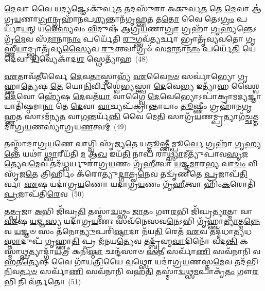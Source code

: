 \-\ul{𑌦𑍇}\-𑌵𑌾 𑌵𑍈 𑌯\-\ul{𑌦𑍍𑌯}\-𑌜𑍍𑌞𑍇\-𑌽𑌕𑍁᳴𑌰𑍍𑌵\-\ul{𑌤} 𑌤𑌦𑌸𑍁᳴𑌰𑌾 𑌅𑌕𑍁𑌰𑍍𑌵\-\ul{𑌤} 𑌤𑍇 \ul{𑌦𑍇}\-𑌵𑌾 𑌆॑𑌗𑍍𑌰\-\ul{𑌯}\-𑌣𑌾\-\ul{𑌗𑍍𑌰𑌾}\-𑌨𑍍𑌗𑍍𑌰𑌹𑌾᳴𑌨𑌪\-\ul{𑌶𑍍𑌯}\-𑌨𑍍𑌤𑌾𑌨᳴𑌗𑍃𑌹𑍍𑌣\-\ul{𑌤} 𑌤\-\ul{𑌤𑍋} 𑌵𑍈 𑌤𑍇\-𑌽\-\ul{𑌗𑍍𑌰𑌂} 𑌪𑌰𑍍𑌯𑌾᳴\-\ul{𑌯}\-\-\ul{𑌨𑍍} 𑌯\-\ul{𑌸𑍍𑌯𑍈}\-𑌵𑌂 \ul{𑌵𑌿}\-𑌦𑍁𑌷᳴ 𑌆𑌗𑍍𑌰\-\ul{𑌯}\-𑌣𑌾\-\ul{𑌗𑍍𑌰𑌾} 𑌗𑍍𑌰𑌹𑌾᳴ \ul{𑌗𑍃}\-𑌹𑍍𑌯𑌨𑍍𑌤𑍇\-𑌽𑌗𑍍𑌰᳴\-\ul{𑌮𑍇}\-𑌵 𑌸᳴\-\ul{𑌮𑌾}\-𑌨𑌾\-\ul{𑌨𑌾𑌂} 𑌪𑌰𑍍𑌯𑍇᳴𑌤𑌿 \ul{𑌰𑍁}\-𑌗𑍍𑌣𑌵᳴\-\ul{𑌤𑍍𑌯}\-𑌰𑍍𑌚𑌾 𑌭𑍍𑌰𑌾𑌤𑍃᳴𑌵𑍍𑌯𑌵𑌤𑍋 𑌗𑍃𑌹𑍍𑌣𑍀\-\ul{𑌯𑌾}\-𑌦𑍍𑌭𑍍𑌰𑌾𑌤𑍃᳴𑌵𑍍𑌯\-\ul{𑌸𑍍𑌯𑍈}\-𑌵 \ul{𑌰𑍁}\-𑌕𑍍𑌤𑍍𑌵𑌾𑌗𑍍𑌰𑍞᳴ 𑌸\-\ul{𑌮𑌾}\-𑌨𑌾\-\ul{𑌨𑌾𑌂} 𑌪𑌰𑍍𑌯𑍇᳴\-\ul{𑌤𑌿} 𑌯𑍇 𑌦𑍇᳴𑌵𑌾 \ul{𑌦𑌿}\-𑌵𑍍𑌯𑍇𑌕𑌾᳴\-𑌦\-\ul{𑌶} 𑌸𑍍𑌥𑍇𑌤𑍍𑌯𑌾᳴𑌹~(48)

\-\ul{𑌏}\-𑌤𑌾𑌵᳴\-\ul{𑌤𑍀}\-𑌰𑍍𑌵𑍈 \ul{𑌦𑍇}\-𑌵\-\ul{𑌤𑌾}\-𑌸𑍍𑌤𑌾𑌭𑍍𑌯᳴ \ul{𑌏}\-𑌵𑍈\-\ul{𑌨}\-\-\ul{𑍞} 𑌸𑌰𑍍𑌵𑌾॑𑌭𑍍𑌯𑍋 𑌗𑍃𑌹𑍍𑌣𑌾\-\ul{𑌤𑍍𑌯𑍇}\-𑌷 \ul{𑌤𑍇} 𑌯𑍋\-\ul{𑌨𑌿}\-𑌰𑍍𑌵𑌿𑌶𑍍𑌵𑍇॑𑌭𑍍𑌯𑌸𑍍𑌤𑍍𑌵𑌾 \ul{𑌦𑍇}\-𑌵𑍇\-\ul{𑌭𑍍𑌯} 𑌇𑌤𑍍𑌯𑌾᳴𑌹 𑌵𑍈𑌶𑍍𑌵\-\ul{𑌦𑍇}\-𑌵𑍋 𑌹𑍍𑌯𑍇᳴𑌷 \ul{𑌦𑍇}\-𑌵𑌤᳴\-\ul{𑌯𑌾} 𑌵𑌾𑌗𑍍𑌵𑍈 \ul{𑌦𑍇}\-𑌵𑍇𑌭𑍍𑌯𑍋\-𑌽𑌪𑌾॑𑌕𑍍𑌰𑌾𑌮\-\ul{𑌦𑍍𑌯}\-𑌜𑍍𑌞𑌾𑌯𑌾𑌤𑌿᳴𑌷𑍍𑌠𑌮𑌾\-\ul{𑌨𑌾} 𑌤𑍇 \ul{𑌦𑍇}\-𑌵𑌾 \ul{𑌵𑌾}\-𑌚𑍍𑌯𑌪᳴𑌕𑍍𑌰𑌾𑌨𑍍𑌤𑌾𑌯𑌾𑌂 \ul{𑌤𑍂}\-𑌷𑍍𑌣𑍀𑌂 𑌗𑍍𑌰𑌹𑌾᳴𑌨𑌗𑍃𑌹𑍍𑌣\-\ul{𑌤} 𑌸𑌾\-𑌽𑌮᳴𑌨𑍍𑌯\-\ul{𑌤} 𑌵𑌾\-\ul{𑌗}\-𑌨𑍍𑌤𑌰𑍍𑌯᳴\-\ul{𑌨𑍍𑌤𑌿} 𑌵𑍈 𑌮𑍇\-\ul{𑌤𑌿} 𑌸𑌾𑌗𑍍𑌰᳴\-\ul{𑌯}\-𑌣𑌮𑍍𑌪𑍍𑌰𑌤𑍍𑌯𑌾𑌗᳴\-\ul{𑌚𑍍𑌛}\-𑌤𑍍𑌤𑌦𑌾॑𑌗𑍍𑌰\-\ul{𑌯}\-𑌣𑌸𑍍𑌯𑌾॑𑌗𑍍𑌰𑌯\-\ul{𑌣}\-𑌤𑍍𑌵𑌮𑍍~(49)

𑌤𑌸𑍍𑌮𑌾᳴𑌦𑌾𑌗𑍍𑌰\-\ul{𑌯}\-𑌣𑍇 𑌵𑌾𑌗𑍍𑌵𑌿 𑌸𑍃᳴𑌜𑍍𑌯\-\ul{𑌤𑍇} 𑌯\-\ul{𑌤𑍍𑌤𑍂}\-𑌷𑍍𑌣𑍀𑌮𑍍𑌪𑍂\-\ul{𑌰𑍍𑌵𑍇} 𑌗𑍍𑌰𑌹𑌾᳴ \ul{𑌗𑍃}\-𑌹𑍍𑌯\-\ul{𑌨𑍍𑌤𑍇} 𑌯𑌥𑌾॑ \ul{𑌥𑍍𑌸𑌾}\-𑌰𑍀𑌯᳴𑌤𑌿 \ul{𑌮} 𑌆\-\ul{𑌖} 𑌇𑌯᳴\-\ul{𑌤𑌿} 𑌨𑌾𑌪᳴ 𑌰𑌾\-\ul{𑌥𑍍𑌸𑍍𑌯𑌾}\-𑌮𑍀𑌤𑍍𑌯𑍁᳴𑌪𑌾𑌵\-\ul{𑌸𑍃}\-𑌜\-\ul{𑌤𑍍𑌯𑍇}\-𑌵\-\ul{𑌮𑍇}\-𑌵 𑌤𑌦᳴\-\ul{𑌧𑍍𑌵}\-𑌰𑍍𑌯𑍁𑌰𑌾॑𑌗𑍍𑌰\-\ul{𑌯}\-𑌣𑌂 𑌗𑍃᳴\-\ul{𑌹𑍀}\-𑌤𑍍𑌵𑌾 \ul{𑌯}\-𑌜𑍍𑌞\-\ul{𑌮𑌾}\-𑌰\-\ul{𑌭𑍍𑌯} 𑌵𑌾\-\ul{𑌚𑌂} 𑌵𑌿 𑌸𑍃᳴𑌜\-\ul{𑌤𑍇} 𑌤𑍍𑌰𑌿𑌰𑍍\mbox{}𑌹𑌿𑌂 𑌕᳴𑌰𑍋𑌤𑍍𑌯𑍁\-\ul{𑌦𑍍𑌗𑌾}\-𑌤𑍄\-\ul{𑌨𑍇}\-𑌵 𑌤𑌦𑍍𑌵𑍃᳴𑌣𑍀𑌤𑍇 \ul{𑌪𑍍𑌰}\-𑌜𑌾𑌪᳴\-\ul{𑌤𑌿}\-𑌰𑍍𑌵𑌾 \ul{𑌏}\-𑌷 𑌯𑌦𑌾॑𑌗𑍍𑌰\-\ul{𑌯}\-𑌣𑍋 𑌯𑌦𑌾॑𑌗𑍍𑌰\-\ul{𑌯}\-𑌣𑌂 𑌗𑍃᳴\-\ul{𑌹𑍀}\-𑌤𑍍𑌵𑌾 𑌹𑌿𑌂᳴\-\ul{𑌕}\-𑌰𑍋𑌤𑌿᳴ \ul{𑌪𑍍𑌰}\-𑌜𑌾𑌪᳴𑌤𑌿\-\ul{𑌰𑍇}\-𑌵~(50)

𑌤\-\ul{𑌤𑍍𑌪𑍍𑌰}\-𑌜𑌾 \ul{𑌅}\-𑌭𑌿 𑌜𑌿᳴𑌘𑍍𑌰\-\ul{𑌤𑌿} 𑌤𑌸𑍍𑌮𑌾॑\-\ul{𑌦𑍍𑌵}\-𑌥𑍍𑌸𑌂 \ul{𑌜𑌾}\-𑌤𑌂 𑌗𑍗\-\ul{𑌰}\-𑌭𑌿 𑌜𑌿᳴𑌘𑍍𑌰\-\ul{𑌤𑍍𑌯𑌾}\-𑌤𑍍𑌮𑌾 𑌵𑌾 \ul{𑌏}\-𑌷 \ul{𑌯}\-𑌜𑍍𑌞\-\ul{𑌸𑍍𑌯} 𑌯𑌦𑌾॑𑌗𑍍𑌰\-\ul{𑌯}\-𑌣𑌃 𑌸𑌵᳴𑌨𑍇𑌸𑌵\-\ul{𑌨𑍇}\-\-𑌽𑌭𑌿 𑌗𑍃᳴𑌹𑍍𑌣𑌾\-\ul{𑌤𑍍𑌯𑌾}\-𑌤𑍍𑌮\-\ul{𑌨𑍍𑌨𑍇}\-𑌵 \ul{𑌯}\-𑌜𑍍𑌞𑍞 𑌸𑌂 𑌤᳴𑌨𑍋\-\ul{𑌤𑍍𑌯𑍁}\-𑌪𑌰𑌿᳴\-\ul{𑌷𑍍𑌟𑌾}\-𑌦𑌾 𑌨᳴𑌯\-\ul{𑌤𑌿} 𑌰𑍇𑌤᳴ \ul{𑌏}\-𑌵 𑌤𑌦𑍍𑌦᳴𑌧𑌾\-\ul{𑌤𑍍𑌯}\-𑌧\-\ul{𑌸𑍍𑌤𑌾}\-𑌦𑍁𑌪᳴ 𑌗𑍃𑌹𑍍𑌣𑌾\-\ul{𑌤𑌿} 𑌪𑍍𑌰 𑌜᳴𑌨𑌯\-\ul{𑌤𑍍𑌯𑍇}\-𑌵 𑌤𑌦𑍍𑌬𑍍𑌰᳴𑌹𑍍𑌮\-\ul{𑌵𑌾}\-𑌦𑌿𑌨𑍋᳴ 𑌵𑌦\-\ul{𑌨𑍍𑌤𑌿} 𑌕𑌸𑍍𑌮𑌾॑\-\ul{𑌥𑍍𑌸}\-𑌤𑍍𑌯𑌾𑌦𑍍𑌗𑌾᳴\-\ul{𑌯}\-𑌤𑍍𑌰𑍀 𑌕𑌨𑌿᳴\-\ul{𑌷𑍍𑌠𑌾} 𑌛𑌨𑍍𑌦᳴𑌸𑌾𑍞 \ul{𑌸}\-𑌤𑍀 𑌸𑌰𑍍𑌵𑌾᳴\-\ul{𑌣𑌿} 𑌸𑌵᳴𑌨𑌾𑌨𑌿 𑌵\-\ul{𑌹}\-𑌤𑍀\-\ul{𑌤𑍍𑌯𑍇}\-𑌷 𑌵𑍈 𑌗𑌾᳴𑌯\-\ul{𑌤𑍍𑌰𑌿}\-𑌯𑍈 \ul{𑌵}\-𑌥𑍍𑌸𑍋 𑌯𑌦𑌾॑𑌗𑍍𑌰\-\ul{𑌯}\-𑌣𑌸𑍍𑌤\-\ul{𑌮𑍇}\-𑌵 𑌤𑌦᳴𑌭𑌿\-\ul{𑌨𑌿}\-𑌵\-\ul{𑌰𑍍𑌤}\-\-\ul{𑍞} 𑌸𑌰𑍍𑌵𑌾᳴\-\ul{𑌣𑌿} 𑌸𑌵᳴𑌨𑌾𑌨𑌿 𑌵𑌹\-\ul{𑌤𑌿} 𑌤𑌸𑍍𑌮𑌾॑\-\ul{𑌦𑍍𑌵}\-𑌥𑍍𑌸\-\ul{𑌮}\-𑌪𑌾𑌕𑍃᳴\-\ul{𑌤𑌂} 𑌗𑍗\-\ul{𑌰}\-𑌭𑌿 𑌨𑌿 𑌵᳴𑌰𑍍𑌤𑌤𑍇॥~(51)

